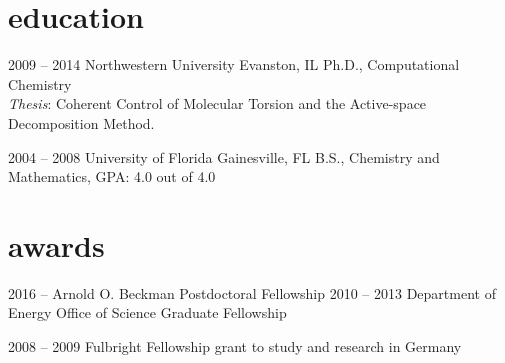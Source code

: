 \documentclass[resume]{parker-cv}
\begin{document}
\section{education}\vspace{-0.5em}

\begin{entrylist}
\entry
{2009 -- 2014}
{Northwestern University}
{Evanston, IL}
{
Ph.D., Computational Chemistry \\
\emph{Thesis}: Coherent Control of Molecular Torsion and the Active-space Decomposition Method.}

\entry
{2004 -- 2008}
{University of Florida}
{Gainesville, FL}
{
B.S., Chemistry and Mathematics, GPA: 4.0 out of 4.0
}

\end{entrylist}

\vspace{0.25cm}
\section{awards} \vspace{-0.5em}
\begin{entrylist}
\vspace{-1em}
\entry
{2016 --}
{Arnold O. Beckman Postdoctoral Fellowship {\normalfont }}
{}
{}
\vspace{-1em}
\entry
{2010 -- 2013}
{Department of Energy Office of Science Graduate Fellowship {\normalfont }}
{}
{}

\entry
{2008 -- 2009}
{Fulbright Fellowship {\normalfont grant to study and research in Germany}}
{}
{}
\end{entrylist}
\end{document}
